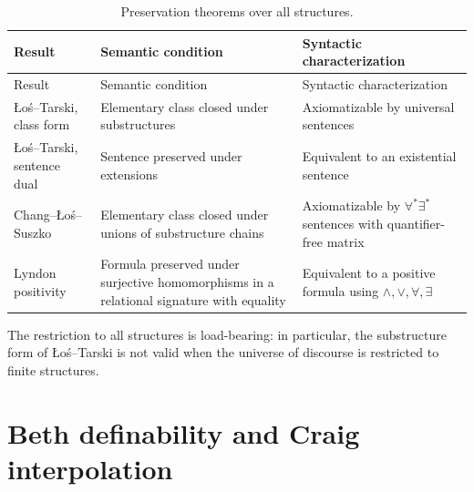 \begingroup\small
\begin{longtable}{@{}p{}p{}p{}@{}}
\caption{Preservation theorems over all structures.}
\label{tab:p03-preservation}\\
\toprule
Result & Semantic condition & Syntactic characterization \\
\midrule
\endfirsthead
\toprule
Result & Semantic condition & Syntactic characterization \\
\midrule
\endhead
{\raggedright \L o\'s--Tarski, class form\par} &
  {\raggedright Elementary class closed under substructures\par} &
  {\raggedright Axiomatizable by universal sentences\par} \\
\addlinespace
{\raggedright \L o\'s--Tarski, sentence dual\par} &
  {\raggedright Sentence preserved under extensions\par} &
  {\raggedright Equivalent to an existential sentence\par} \\
\addlinespace
{\raggedright Chang--\L o\'s--Suszko\par} &
  {\raggedright Elementary class closed under unions of substructure chains\par} &
  {\raggedright Axiomatizable by \(\forall^{*}\exists^{*}\) sentences with
  quantifier-free matrix\par} \\
\addlinespace
{\raggedright Lyndon positivity\par} &
  {\raggedright Formula preserved under surjective homomorphisms in a
  relational signature with equality\par} &
  {\raggedright Equivalent to a positive formula using
  \(\land,\lor,\forall,\exists\)\par} \\
\bottomrule
\end{longtable}
\endgroup

The restriction to all structures is load-bearing: in particular, the
substructure form of \L o\'s--Tarski is not valid when the universe of discourse
is restricted to finite structures.

\section{Beth definability and Craig interpolation}
\label{sec:p03-beth-craig}

